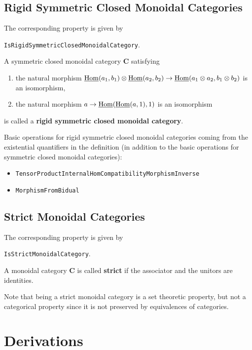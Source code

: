 \subsection{Rigid Symmetric Closed Monoidal Categories}

\begin{documentation}
 The corresponding \GAP property is given by
 \begin{center}
  \texttt{IsRigidSymmetricClosedMonoidalCategory}.  
 \end{center}
\end{documentation}

\begin{definition}\cite{Deligne}
 A symmetric closed monoidal category $\mathbf{C}$ satisfying
 \begin{enumerate}
  \item the natural morphism
  $\underline{\operatorname{\mathrm{Hom}}}(a_1,b_1) \otimes \underline{\operatorname{\mathrm{Hom}}}(a_2,b_2) \rightarrow \underline{\operatorname{\mathrm{Hom}}}(a_1 \otimes a_2,b_1 \otimes b_2)$
  is an isomorphism,
  \item the natural morphism
  $a \rightarrow \underline{\operatorname{\mathrm{Hom}}}(\underline{\operatorname{\mathrm{Hom}}}(a, 1), 1)$
  is an isomorphism
 \end{enumerate}
 is called a \textbf{rigid symmetric closed monoidal category}.
\end{definition}

Basic operations for rigid symmetric closed monoidal categories coming from the existential quantifiers
in the definition
(in addition to the basic operations for symmetric closed monoidal categories):
\begin{itemize}
  \item \texttt{TensorProductInternalHomCompatibilityMorphismInverse}
  \item \texttt{MorphismFromBidual}
\end{itemize}

\subsection{Strict Monoidal Categories}

\begin{documentation}
 The corresponding \GAP property is given by
 \begin{center}
  \texttt{IsStrictMonoidalCategory}.  
 \end{center}
\end{documentation}

\begin{definition}
 A monoidal category $\mathbf{C}$ is called \textbf{strict}
 if the associator and the unitors are identities.
\end{definition}

\begin{remark}
 Note that being a strict monoidal category is
 a set theoretic property, but
 not a categorical property
 since it is not preserved by equivalences of categories.
\end{remark}


\section{Derivations}\label{section:derivations}